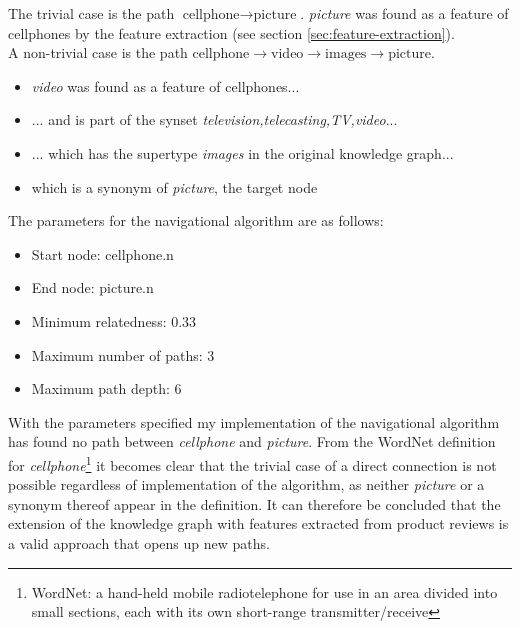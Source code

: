 \begin{minipage}{0.5\textwidth}
    The trivial case is the path $\text{cellphone} \rightarrow \text{picture}$. \textit{picture} was found as a feature of cellphones by the feature extraction (see section \ref{sec:feature-extraction}).\\
    A non-trivial case is the path $\text{cellphone} \rightarrow \text{video} \rightarrow \text{images} \rightarrow \text{picture}$. 
    \begin{itemize}
        \item \textit{video} was found as a feature of cellphones...
        \item  ... and is part of the synset \textit{television,telecasting,TV,video}...
        \item ... which has the supertype \textit{images} in the original knowledge graph...
        \item which is a synonym of \textit{picture}, the target node
    \end{itemize}
    The parameters for the navigational algorithm are as follows:
    \begin{itemize}
        \item Start node: cellphone.n
        \item End node: picture.n
        \item Minimum relatedness: 0.33
        \item Maximum number of paths: 3
        \item Maximum path depth: 6
    \end{itemize}
\end{minipage}

With the parameters specified my implementation of the navigational algorithm has found no path between \textit{cellphone} and \textit{picture}.
From the WordNet definition for \textit{cellphone}\footnote{WordNet: a hand-held mobile radiotelephone for use in an area divided into small sections, each with its own short-range transmitter/receive} it becomes clear that the trivial case of a direct connection is not possible regardless of implementation of the algorithm, as neither \textit{picture} or a synonym thereof appear in the definition. It can therefore be concluded that the extension of the knowledge graph with features extracted from product reviews is a valid approach that opens up new paths.

